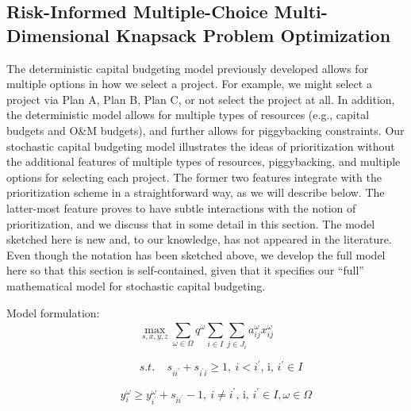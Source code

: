 \subsection{Risk-Informed Multiple-Choice Multi-Dimensional Knapsack Problem Optimization}
\label{subsec:RImckp}














The deterministic capital budgeting model previously developed allows for multiple options in how
we select a project. For example, we might select a project via Plan A, Plan B, Plan C, or not
select the project at all. In addition, the deterministic model allows for multiple types of
resources (e.g., capital budgets and O\&M budgets), and further allows for piggybacking constraints.
Our stochastic capital budgeting model illustrates the ideas of prioritization without the
additional features of multiple types of resources, piggybacking, and multiple options for selecting
each project.  The former two features integrate with the prioritization scheme in a straightforward
way, as we will describe below. The latter-most feature proves to have subtle interactions with
the notion of prioritization, and we discuss that in some detail in this section. The model
sketched here is new and, to our knowledge, has not appeared in the literature. Even though the
notation has been sketched above, we develop the full model here so that this section is
self-contained, given that it specifies our “full” mathematical model for stochastic capital
budgeting.



Model formulation:\\

\begin{equation}\label{stoc_obja}
\mathop{\max}_{s,x,y,z} \sum _{ \omega  \in  \Omega }^{}q^{ \omega } \sum _{i \in I}^{} \sum _{j \in J_{i}}^{}a_{ij}^{ \omega }x_{ij}^{ \omega }
\end{equation}

\begin{equation}\label{stoc_objb}
~~~~~~~~~~~~s.t.~~~~~s_{ii^{'}}+s_{i^{'}i} \geq 1,~ i<i^{'}\text{, i, }i^{'} \in I
\end{equation}

\begin{equation}\label{stoc_objc}
~~~~~~~~y_{i}^{ \omega } \geq y_{i^{'}}^{ \omega }+s_{ii^{'}}-1,~ i \neq i^{'}\text{, i, }i^{'} \in I,  \omega  \in  \Omega
\end{equation}

